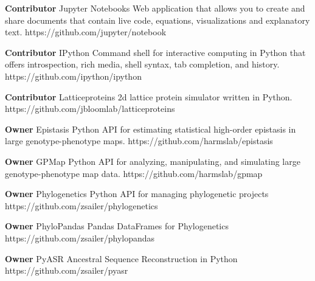 \begin{cvossoftware}

  \cvoss
    {\textbf{Contributor} Jupyter Notebooks} %
    {Web application that allows you to create and share documents that contain live code, equations, visualizations and explanatory text.} %
    {https://github.com/jupyter/notebook} %

  \cvoss
    {\textbf{Contributor} IPython} %
    {Command shell for interactive computing in Python that offers introspection, rich media, shell syntax, tab completion, and history.}
    {https://github.com/ipython/ipython} %

  \cvoss
    {\textbf{Contributor} Latticeproteins} %
    {2d lattice protein simulator written in Python.}
    {https://github.com/jbloomlab/latticeproteins} %

  \cvoss
    {\textbf{Owner} Epistasis} %
    {Python API for estimating statistical high-order epistasis in large genotype-phenotype maps.}
    {https://github.com/harmslab/epistasis} %

  \cvoss
    {\textbf{Owner} GPMap} %
    {Python API for analyzing, manipulating, and simulating large genotype-phenotype map data.}
    {https://github.com/harmslab/gpmap} %

  \cvoss
    {\textbf{Owner} Phylogenetics} %
    {Python API for managing phylogenetic projects}
    {https://github.com/zsailer/phylogenetics} %

  \cvoss
    {\textbf{Owner} PhyloPandas} %
    {Pandas DataFrames for Phylogenetics}
    {https://github.com/zsailer/phylopandas} %

  \cvoss
    {\textbf{Owner} PyASR} %
    {Ancestral Sequence Reconstruction in Python}
    {https://github.com/zsailer/pyasr} %

\end{cvossoftware}
